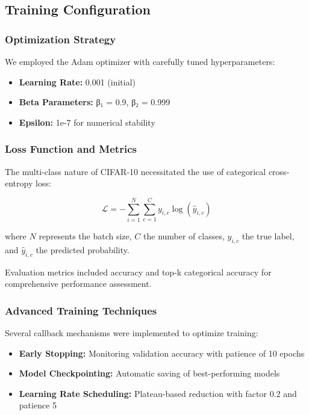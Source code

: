 \documentclass[11pt,a4paper]{article}
\begin{document}
\subsection{Training Configuration}

\subsubsection{Optimization Strategy}

We employed the Adam optimizer with carefully tuned hyperparameters:

\begin{itemize}
    \item \textbf{Learning Rate:} 0.001 (initial)
    \item \textbf{Beta Parameters:} β₁ = 0.9, β₂ = 0.999
    \item \textbf{Epsilon:} 1e-7 for numerical stability
\end{itemize}

\subsubsection{Loss Function and Metrics}

The multi-class nature of CIFAR-10 necessitated the use of categorical cross-entropy loss:

\begin{equation}
\mathcal{L} = -\sum_{i=1}^{N} \sum_{c=1}^{C} y_{i,c} \log(\hat{y}_{i,c})
\end{equation}

where $N$ represents the batch size, $C$ the number of classes, $y_{i,c}$ the true label, and $\hat{y}_{i,c}$ the predicted probability.

Evaluation metrics included accuracy and top-k categorical accuracy for comprehensive performance assessment.

\subsubsection{Advanced Training Techniques}

Several callback mechanisms were implemented to optimize training:

\begin{itemize}
    \item \textbf{Early Stopping:} Monitoring validation accuracy with patience of 10 epochs
    \item \textbf{Model Checkpointing:} Automatic saving of best-performing models
    \item \textbf{Learning Rate Scheduling:} Plateau-based reduction with factor 0.2 and patience 5
\end{itemize}
\end{document}
